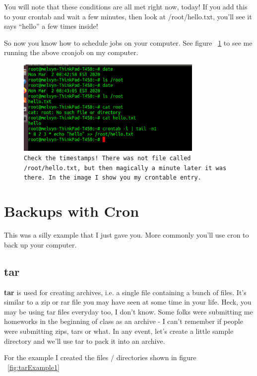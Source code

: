 \documentclass[12pt,a4paper]{article}
\begin{document}
You will note that these conditions are all met right now, today! If you add
this to your crontab and wait a few minutes, then look at /root/hello.txt,
you'll see it says ``hello'' a few times inside!

So now you know how to schedule jobs on your computer. See figure
~\ref{fig:cronOnLaptop} to see me running the above cronjob on my computer. 

\begin{figure}[h]
\centering
	\includegraphics[width=0.8\textwidth]{Images/cronOnLaptop.png}
	\caption{{\small \texttt{Check the timestamps! There was not file called /root/hello.txt,
but then magically a minute later it was there. In the image I show you my
crontable entry.}}}
	\label{fig:cronOnLaptop}
\end{figure}

\section{Backups with Cron}
This was a silly example that I just gave you. More commonly you'll use cron to
back up your computer.

\subsection{tar}
\textbf{tar} is used for creating archives, i.e. a single file containing a bunch of
files. It's similar to a zip or rar file you may have seen at some time in your
life. Heck, you may be using tar files everyday too, I don't know. Some folks
were submitting me homeworks in the beginning of class as an archive - I can't
remember if people were submitting zips, tars or what. In any event, let's
create a little sample directory  and we'll use tar to pack it into an archive.


For the example I created the files / directories shown in figure
~\ref{fig:tarExample1}
\end{document}
